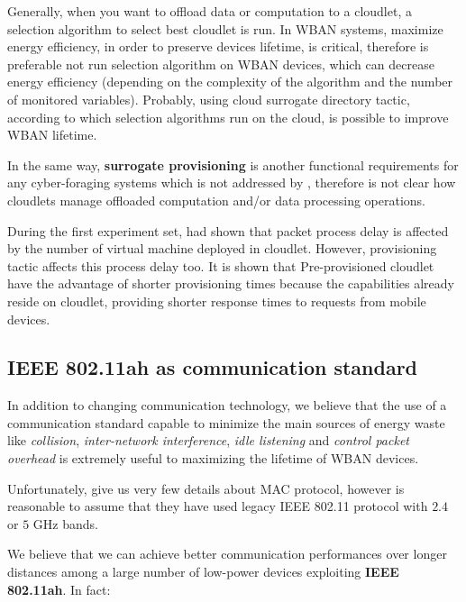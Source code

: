\documentclass[sigchi]{acmart}
\begin{document}
Generally, when you want to offload data or computation to a cloudlet, a selection algorithm to select best cloudlet is run. In WBAN systems, maximize energy efficiency, in order to preserve devices lifetime, is critical, therefore is preferable not run selection algorithm on WBAN devices, which can decrease energy efficiency (depending on the complexity of the algorithm and the number of monitored variables). Probably, using cloud surrogate directory tactic, according to which selection algorithms run on the cloud, is possible to improve WBAN lifetime. \cite{DecisionModel}

In the same way, \textbf{surrogate provisioning} is another functional requirements for any cyber-foraging systems which is not addressed by \citep{MSAReport}, therefore is not clear how cloudlets manage offloaded computation and/or data processing operations.

During the first experiment set, \citet{MSAReport} had shown that packet process delay is affected by the number of virtual machine deployed in cloudlet. However, provisioning tactic affects this process delay too. It is shown that Pre-provisioned cloudlet have the advantage of shorter provisioning times because the capabilities already reside on cloudlet, providing shorter response times to requests from mobile devices.\cite{DecisionModel}

\subsection{IEEE 802.11ah as communication standard}

In addition to changing communication technology, we believe that the use of a communication standard capable to minimize the main sources of energy waste like \textit{collision}, \textit{inter-network interference}, \textit{idle listening} and \textit{control packet overhead} is extremely useful to maximizing the lifetime of WBAN devices.

Unfortunately, \citet{MSAReport} give us very few details about MAC protocol, however is reasonable to assume that they have used legacy IEEE 802.11 protocol with $2.4$ or $5$ GHz bands.

We believe that we can achieve better communication performances over longer distances among a large number of low-power devices exploiting \textbf{IEEE 802.11ah}. In fact:
\end{document}
